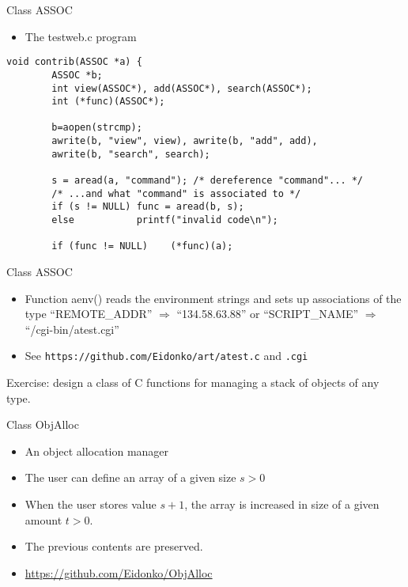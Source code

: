 \begin{frame}[fragile]{Class ASSOC}
\begin{itemize}
\item The testweb.c program 
\end{itemize}
\begin{small}
\begin{verbatim}
void contrib(ASSOC *a) {
        ASSOC *b;
        int view(ASSOC*), add(ASSOC*), search(ASSOC*);
        int (*func)(ASSOC*);

        b=aopen(strcmp);
        awrite(b, "view", view), awrite(b, "add", add),
        awrite(b, "search", search);

        s = aread(a, "command"); /* dereference "command"... */
        /* ...and what "command" is associated to */
        if (s != NULL) func = aread(b, s);
        else           printf("invalid code\n");
        
        if (func != NULL)    (*func)(a);
\end{verbatim}
\end{small}

\end{frame}
\begin{frame}[fragile]{Class ASSOC}
\begin{itemize}
\item Function aenv() reads the environment strings and
	sets up associations of the type
	``REMOTE\_ADDR'' $\Rightarrow$ ``134.58.63.88''
	or ``SCRIPT\_NAME''  $\Rightarrow$ ``/cgi-bin/atest.cgi''
\item See \verb"https://github.com/Eidonko/art/atest.c"
and \verb".cgi"
\end{itemize}


\vspace{20pt}

Exercise: design a class of C functions for managing a stack of
objects of any type.



\end{frame}
\begin{frame}[fragile]{Class ObjAlloc}
\begin{itemize}
\item An object allocation manager
\item The user can define an array of a given size $s>0$
\item When the user stores value $s+1$, the array
      is increased in size of a given amount $t>0$.
\item The previous contents are preserved.
\item \url{https://github.com/Eidonko/ObjAlloc}
\end{itemize}

\end{frame}
